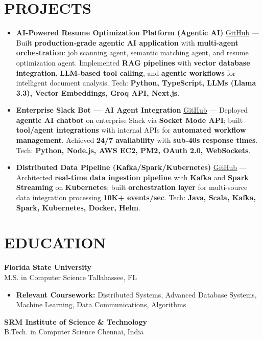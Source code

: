 \documentclass[letterpaper,10pt]{article}
\newcommand{\resumeItem}[1]{\item\small #1}
\newcommand{\resumeSubheading}[4]{
  \vspace{6pt}
  \noindent
  \textbf{#1} \hfill {\footnotesize #2} \\
  [-1pt]
  \noindent
  \small #3 \hfill {\small #4}
  \vspace{3pt}
}
\newcommand{\resumeItemsStart}{\vspace{-2pt}\begin{itemize}}
\newcommand{\resumeItemsEnd}{\end{itemize}\vspace{6pt}}
\begin{document}
\section{\textcolor{metablue}{PROJECTS}}
\vspace{-5pt}
\begin{tcolorbox}[colback=white,colframe=metablue,boxrule=0.8pt,arc=2pt,left=4pt,right=4pt,top=2pt,bottom=2pt]
\begin{itemize}
\resumeItem{\textbf{AI-Powered Resume Optimization Platform (Agentic AI)} \href{https://github.com/adityasugandhi}{GitHub} --- Built \textbf{production-grade agentic AI application} with \textbf{multi-agent orchestration}: job scanning agent, semantic matching agent, and resume optimization agent. Implemented \textbf{RAG pipelines} with \textbf{vector database integration}, \textbf{LLM-based tool calling}, and \textbf{agentic workflows} for intelligent document analysis. Tech: \textbf{Python, TypeScript, LLMs (Llama 3.3), Vector Embeddings, Groq API, Next.js}.}
\resumeItem{\textbf{Enterprise Slack Bot — AI Agent Integration} \href{https://github.com/adityasugandhi}{GitHub} --- Deployed \textbf{agentic AI chatbot} on enterprise Slack via \textbf{Socket Mode API}; built \textbf{tool/agent integrations} with internal APIs for \textbf{automated workflow management}. Achieved \textbf{24/7 availability} with \textbf{sub-40s response times}. Tech: \textbf{Python, Node.js, AWS EC2, PM2, OAuth 2.0, WebSockets}.}
\resumeItem{\textbf{Distributed Data Pipeline (Kafka/Spark/Kubernetes)} \href{https://github.com/adityasugandhi}{GitHub} --- Architected \textbf{real-time data ingestion pipeline} with \textbf{Kafka} and \textbf{Spark Streaming} on \textbf{Kubernetes}; built \textbf{orchestration layer} for multi-source data integration processing \textbf{10K+ events/sec}. Tech: \textbf{Java, Scala, Kafka, Spark, Kubernetes, Docker, Helm}.}
\end{itemize}
\end{tcolorbox}
\vspace{-5pt}


\section{\textcolor{metablue}{EDUCATION}}
\vspace{-10pt}
\resumeSubheading
{Florida State University}{}
{M.S. in Computer Science}{Tallahassee, FL}
\resumeItemsStart
\resumeItem{\textbf{Relevant Coursework:} Distributed Systems, Advanced Database Systems, Machine Learning, Data Communications, Algorithms}
\resumeItemsEnd
\vspace{-5pt}
\resumeSubheading
{SRM Institute of Science \& Technology}{}
{B.Tech. in Computer Science}{Chennai, India}
\vspace{-10pt}
\end{document}
